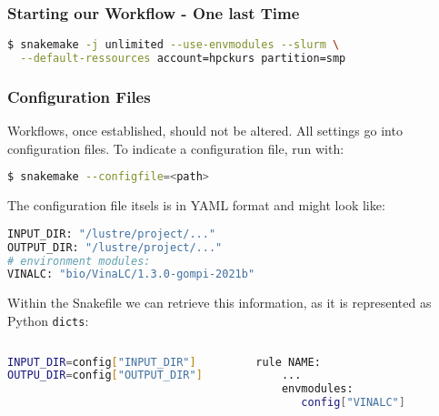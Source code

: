\begin{frame}[fragile]
  \frametitle{Starting our Workflow - One last Time}
  \begin{lstlisting}[language=Bash,style=Shell]
$ snakemake -j unlimited --use-envmodules --slurm \
  --default-ressources account=hpckurs partition=smp
  \end{lstlisting}
\end{frame}

\begin{frame}[fragile]
  \frametitle{Configuration Files}
  Workflows, once established, should not be altered. All settings go into configuration files. To indicate a configuration file, run with:
  \begin{lstlisting}[language=Bash,style=Shell]
$ snakemake --configfile=<path>
  \end{lstlisting}\pause
  The configuration file itsels is in YAML format and might look like:
  \begin{lstlisting}[language=Python,style=Python]
INPUT_DIR: "/lustre/project/..."
OUTPUT_DIR: "/lustre/project/..."
# environment modules:
VINALC: "bio/VinaLC/1.3.0-gompi-2021b"
  \end{lstlisting}\pause
    Within the Snakefile we can retrieve this information, as it is represented as Python \texttt{dicts}:
  \begin{columns}
     \begin{column}{0.5\textwidth}
       \begin{lstlisting}[language=Bash,style=Shell,basicstyle=\small]
INPUT_DIR=config["INPUT_DIR"]
OUTPU_DIR=config["OUTPUT_DIR"]
       \end{lstlisting}
     \end{column}
     \begin{column}{0.5\textwidth}
      \begin{lstlisting}[language=Bash,style=Shell,basicstyle=\small] 
rule NAME:
    ...
    envmodules:
       config["VINALC"]    
      \end{lstlisting}

     \end{column}
  \end{columns}

\end{frame}



